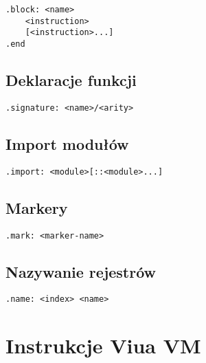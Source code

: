 \begin{lstlisting}
.block: <name>
	<instruction>
	[<instruction>...]
.end
\end{lstlisting}

\subsection{Deklaracje funkcji}

\begin{lstlisting}
.signature: <name>/<arity>
\end{lstlisting}

\subsection{Import modułów}
\label{appendix_viua_vm_assembly_language_dir_import}

\begin{lstlisting}
.import: <module>[::<module>...]
\end{lstlisting}

\subsection{Markery}

\begin{lstlisting}
.mark: <marker-name>
\end{lstlisting}

\subsection{Nazywanie rejestrów}

\begin{lstlisting}
.name: <index> <name>
\end{lstlisting}

\newpage
\section{Instrukcje Viua VM}
\label{appendix_viua_vm_assembly_language_ops}















